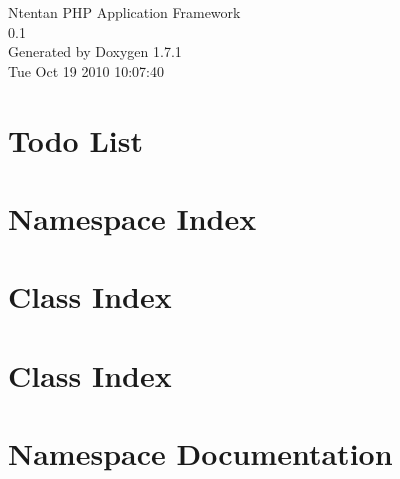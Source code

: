 \documentclass[a4paper]{book}
\begin{document}
\hypersetup{pageanchor=false}
\begin{titlepage}
\vspace*{7cm}
\begin{center}
{\Large Ntentan PHP Application Framework \\[1ex]\large 0.1 }\\
\vspace*{1cm}
{\large Generated by Doxygen 1.7.1}\\
\vspace*{0.5cm}
{\small Tue Oct 19 2010 10:07:40}\\
\end{center}
\end{titlepage}
\clearemptydoublepage
{}
\tableofcontents
\clearemptydoublepage
{}
\hypersetup{pageanchor=true}
\chapter{Todo List}
\label{todo}
\hypertarget{todo}{}

\chapter{Namespace Index}

\chapter{Class Index}

\chapter{Class Index}

\chapter{Namespace Documentation}






\end{document}
